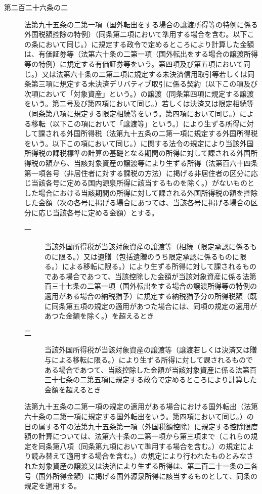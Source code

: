 \documentclass[twocolumn,a4j,10pt]{ltjtarticle}
\begin{document}
\begin{description}
\item[第二百二十六条の二]法第九十五条の二第一項（国外転出をする場合の譲渡所得等の特例に係る外国税額控除の特例）（同条第二項において準用する場合を含む。以下この条において同じ。）に規定する政令で定めるところにより計算した金額は、有価証券等（法第六十条の二第一項（国外転出をする場合の譲渡所得等の特例）に規定する有価証券等をいう。第四項及び第五項において同じ。）又は法第六十条の二第二項に規定する未決済信用取引等若しくは同条第三項に規定する未決済デリバティブ取引に係る契約（以下この項及び次項において「対象資産」という。）の譲渡（同条第四項に規定する譲渡をいう。第二号及び第四項において同じ。）若しくは決済又は限定相続等（同条第八項に規定する限定相続等をいう。第四項において同じ。）による移転（以下この項において「譲渡等」という。）により生ずる所得に対して課される外国所得税（法第九十五条の二第一項に規定する外国所得税をいう。以下この項において同じ。）に関する法令の規定により当該外国所得税の課税標準の計算の基礎となる期間の所得に対して課される外国所得税の額から、当該対象資産の譲渡等により生ずる所得（法第百六十四条第一項各号（非居住者に対する課税の方法）に掲げる非居住者の区分に応じ当該各号に定める国内源泉所得に該当するものを除く。）がないものとした場合における当該期間の所得に対して課される外国所得税の額を控除した金額（次の各号に掲げる場合にあつては、当該各号に掲げる場合の区分に応じ当該各号に定める金額）とする。
\begin{description}
\item[一]当該外国所得税が当該対象資産の譲渡等（相続（限定承認に係るものに限る。）又は遺贈（包括遺贈のうち限定承認に係るものに限る。）による移転に限る。）により生ずる所得に対して課されるものである場合であつて、当該控除した金額が当該対象資産に係る法第百三十七条の二第一項（国外転出をする場合の譲渡所得等の特例の適用がある場合の納税猶予）に規定する納税猶予分の所得税額（既に同条第五項の規定の適用があつた場合には、同項の規定の適用があつた金額を除く。）を超えるとき
\item[二]当該外国所得税が当該対象資産の譲渡等（譲渡若しくは決済又は贈与による移転に限る。）により生ずる所得に対して課されるものである場合であつて、当該控除した金額が当該対象資産に係る法第百三十七条の二第五項に規定する政令で定めるところにより計算した金額を超えるとき
\end{description}
\item[]法第九十五条の二第一項の規定の適用がある場合における国外転出（法第六十条の二第一項に規定する国外転出をいう。第四項において同じ。）の日の属する年の法第九十五条第一項（外国税額控除）に規定する控除限度額の計算については、法第六十条の二第一項から第三項まで（これらの規定を同条第八項（同条第九項において準用する場合を含む。）の規定により読み替えて適用する場合を含む。）の規定により行われたものとみなされた対象資産の譲渡又は決済により生ずる所得は、第二百二十一条の二各号（国外所得金額）に掲げる国外源泉所得に該当するものとして、同条の規定を適用する。

\end{description}
\end{document}
